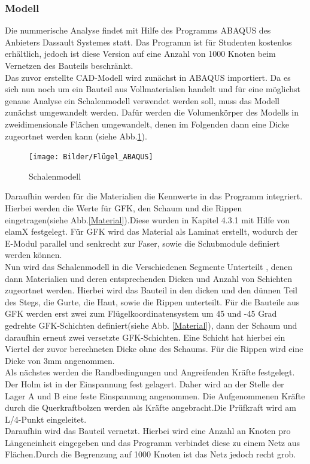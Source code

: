 
\subsubsection{Modell}
Die nummerische Analyse findet mit Hilfe des Programms ABAQUS des Anbieters Dassault Systemes statt. Das Programm ist für Studenten kostenlos erhältlich, jedoch ist diese Version auf eine Anzahl von 1000 Knoten beim Vernetzen des Bauteils beschränkt.\\
Das zuvor erstellte CAD-Modell wird zunächst in ABAQUS importiert. Da es sich nun noch um ein Bauteil aus Vollmaterialien handelt und für eine möglichst genaue Analyse ein Schalenmodell verwendet werden soll, muss das Modell zunächst umgewandelt werden. Dafür werden die Volumenkörper des Modells in zweidimensionale Flächen umgewandelt, denen im Folgenden dann eine Dicke zugeortnet werden kann (siehe Abb.\ref{Schalenmodell}).

\begin{figure}[h]
 \centering
 \texttt{[image: Bilder/Flügel\_ABAQUS]}
 \caption{Schalenmodell}
 \label{Schalenmodell}
\end{figure}
\newpage
\noindent
Daraufhin werden für die Materialien die Kennwerte in das Programm integriert. Hierbei werden die Werte für GFK, den Schaum und die Rippen eingetragen(siehe Abb.\ref{Material}).Diese wurden in Kapitel 4.3.1 mit Hilfe von elamX festgelegt. Für GFK wird das Material als Laminat erstellt, wodurch der E-Modul parallel und senkrecht zur Faser, sowie die Schubmodule definiert werden können.\\
\noindent
Nun wird das Schalenmodell in die Verschiedenen Segmente Unterteilt , denen dann Materialien und deren entsprechenden Dicken und Anzahl von Schichten zugeortnet werden. Hierbei wird das Bauteil in den dicken und den dünnen Teil des Stegs, die Gurte, die Haut, sowie die Rippen unterteilt. Für die Bauteile aus GFK werden erst zwei zum Flügelkoordinatensystem um 45 und -45 Grad gedrehte GFK-Schichten definiert(siehe Abb. \ref{Material}), dann der Schaum und daraufhin erneut zwei versetzte GFK-Schichten. Eine Schicht hat hierbei ein Viertel der zuvor berechneten Dicke ohne des Schaums. Für die Rippen wird eine Dicke von 3mm angenommen.\\
\noindent
Als nächstes werden die Randbedingungen und Angreifenden Kräfte festgelegt. Der Holm ist in der Einspannung fest gelagert. Daher wird an der Stelle der Lager A und B eine feste Einspannung angenommen. Die Aufgenommenen Kräfte durch die Querkraftbolzen werden als Kräfte angebracht.Die Prüfkraft wird am L/4-Punkt eingeleitet.\\
Daraufhin wird das Bauteil vernetzt. Hierbei wird eine Anzahl an Knoten pro Längeneinheit eingegeben und das Programm verbindet diese zu einem Netz aus Flächen.Durch die Begrenzung auf 1000 Knoten ist das Netz jedoch recht grob. \\
\newpage
